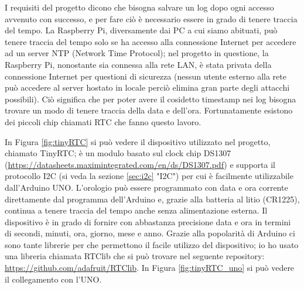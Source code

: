 \documentclass[12pt]{report}
\begin{document}
I requisiti del progetto dicono che bisogna salvare un log dopo ogni accesso avvenuto con successo, e per fare ciò è necessario essere in grado di tenere traccia del tempo. La Raspberry Pi, diversamente dai PC a cui siamo abituati, può tenere traccia del tempo solo se ha accesso alla connessione Internet per accedere ad un server NTP (Network Time Protocol); nel progetto in questione, la Raspberry Pi, nonostante sia connessa alla rete LAN, è stata privata della connessione Internet per questioni di sicurezza (nessun utente esterno alla rete può accedere al server hostato in locale perciò elimina gran parte degli attacchi possibili). Ciò significa che per poter avere il cosidetto timestamp nei log bisogna trovare un modo di tenere traccia della data e dell'ora. Fortunatamente esistono dei piccoli chip chiamati RTC che fanno questo lavoro. 

In Figura \ref{fig:tinyRTC} si può vedere il dispositivo utilizzato nel progetto, chiamato TinyRTC; è un modulo basato sul clock chip DS1307 (\url{https://datasheets.maximintegrated.com/en/ds/DS1307.pdf}) e supporta il protocollo I2C (si veda la sezione \ref{sec:i2c} "I2C") per cui è facilmente utilizzabile dall'Arduino UNO.
L'orologio può essere programmato con data e ora corrente direttamente dal programma dell'Arduino e, grazie alla batteria al litio (CR1225), continua a tenere traccia del tempo anche senza alimentazione esterna. Il dispositivo è in grado di fornire con abbastanza precisione data e ora in termini di secondi, minuti, ora, giorno, mese e anno. Grazie alla popolarità di Arduino ci sono tante librerie per che permettono il facile utilizzo del dispositivo; io ho usato una libreria chiamata RTClib che si può trovare nel seguente repository: \url{https://github.com/adafruit/RTClib}. In Figura \ref{fig:tinyRTC_uno} si può vedere il collegamento con l'UNO.
\end{document}
